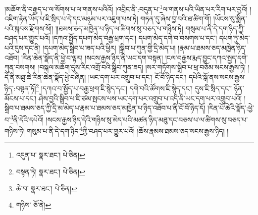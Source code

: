 །མཆོག་ནི་བརྒྱད་པ་ལ་སོགས་པ་ལ་གནས་པའིའོ། །འབྲིང་ནི་:བདུན་པ་\footnote{འདུན་པ་  སྣར་ཐང་།  པེ་ཅིན། }ལ་གནས་པའི་ཡིན་པར་རིག་པར་བྱའོ། །འཇིག་རྟེན་ཡོད་པ་ཇི་སྲིད་པ་དེ་དང་མཉམ་པར་འཇུག་པས་ཏེ། གཏན་དུ་ཞེས་བྱ་བའི་ཐ་ཚིག་གོ། །ཡོངས་སུ་སྨིན་པའི་སྐབས་རྫོགས་སོ།། །།ཐམས་ཅད་མཁྱེན་པ་ཉིད་ལ་ཚིགས་སུ་བཅད་པ་གཉིས་ཏེ། གསུམ་པ་ནི་དེ་དག་ཉིད་ཀྱི་བཤད་པར་གྱུར་པའོ། །དཀའ་སྤྱོད་དཔག་མེད་བརྒྱ་ཕྲག་དང་། དཔག་མེད་དགེ་བ་བསགས་པ་དང་། དཔག་ཏུ་མེད་པའི་དུས་དང་ནི། །དཔག་མེད་སྒྲིབ་པ་ཟད་པའི་ཕྱིར། །སྒྲིབ་པ་ཀུན་གྱི་དྲི་མེད་པ། །རྣམ་པ་ཐམས་ཅད་མཁྱེན་ཉིད་འཐོབ། །རིན་ཆེན་སྣོད་ནི་ཕྱེ་བ་ལྟར། །སངས་རྒྱས་ཉིད་ནི་ཡང་དག་བསྟན། །ངལ་བརྒྱས་རྨད་བྱུང་དཀའ་སྤྱད་དགེ་ཀུན་བསགས། །བསྐལ་མཆོག་དུས་རིང་འགྲོ་བའི་སྒྲིབ་ཀུན་ཟད། །སར་གཏོགས་སྒྲིབ་པ་ཕྲ་བཅོམ་སངས་རྒྱས་ཏེ། །དེ་ནི་མཐུ་ཆེ་རིན་ཆེན་སྣོད་ཕྱེ་བཞིན། །ཡང་དག་པར་འགྲུབ་པ་དང་། ངོ་བོ་ཉིད་དང་། དཔེའི་སྒོ་ནས་སངས་རྒྱས་ཉིད་:བསྟན་ཏོ།\footnote{བསྟན་ཏེ།  སྣར་ཐང་།  པེ་ཅིན། } །དཀའ་བ་སྤྱོད་པ་བརྒྱ་ཕྲག་ཇི་སྙེད་དང་། དགེ་བའི་ཚོགས་ཇི་སྙེད་དང་། དུས་ཇི་སྲིད་དང་། ཉོན་མོངས་པ་དང་། ཤེས་བྱའི་སྒྲིབ་པ་ཇི་ཙམ་སྤངས་པས་ཡང་དག་པར་འགྲུབ་པ་འདི་ནི་ཡང་དག་པར་འགྲུབ་པའོ། །སྒྲིབ་པ་ཐམས་ཅད་ཀྱི་དྲི་མ་མེད་པ་རྣམ་པ་ཐམས་ཅད་མཁྱེན་པ་ཉིད་འཐོབ་པ་ནི་ངོ་བོ་ཉིད་དོ། །རིན་པོ་ཆེའི་སྣོད་:ཕྱེ་བ་\footnote{ཆེ་བ་  སྣར་ཐང་།  པེ་ཅིན། }ནི་དེའི་དཔེའོ། །སངས་རྒྱས་ཉིད་དེའི་གཉིས་སུ་མེད་པའི་མཚན་ཉིད་མཐུ་དང་བཅས་པ་ལ་ཚིགས་སུ་བཅད་པ་གཉིས་ཏེ། གསུམ་པ་ནི་དེ་དག་ཉིད་\footnote{གཉིས་  ཅོ་ནེ། }ཀྱི་བཤད་པར་གྱུར་པའོ། །ཆོས་རྣམས་ཐམས་ཅད་སངས་རྒྱས་ཉིད། །
